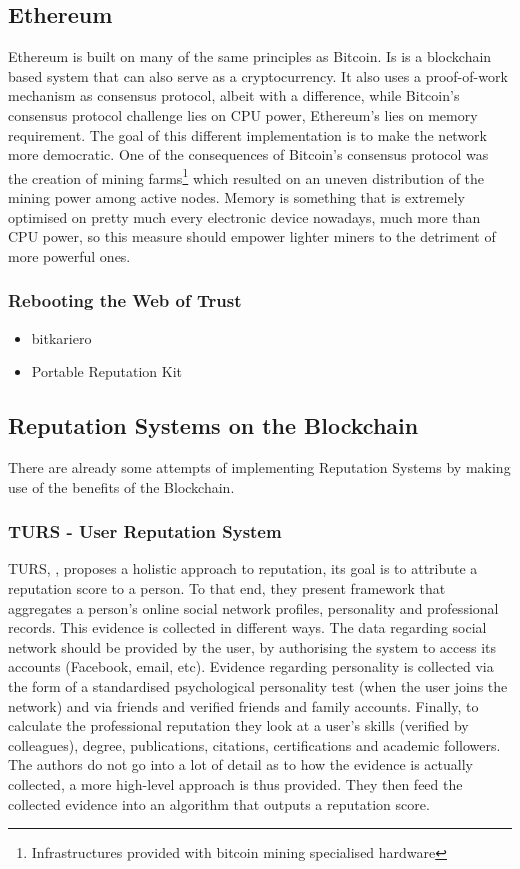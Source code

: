 \documentclass[llncsdoc]{llncs}
\begin{document}
\subsection{Ethereum}
Ethereum is built on many of the same principles as Bitcoin. Is is a blockchain based system that can also serve as a cryptocurrency. It also uses a proof-of-work mechanism as consensus protocol, albeit with a difference, while Bitcoin's consensus protocol challenge lies on CPU power, Ethereum's lies on memory requirement. The goal of this different implementation is to make the network more democratic. One of the consequences of Bitcoin's consensus protocol was the creation of mining farms\footnote{Infrastructures provided with bitcoin mining specialised hardware} which resulted on an uneven distribution of the mining power among active nodes. Memory is something that is extremely optimised on pretty much every electronic device nowadays, much more than CPU power, so this measure should empower lighter miners to the detriment of more powerful ones.  


\subsubsection{Rebooting the Web of Trust}
\begin{itemize}
    \item bitkariero
    \item Portable Reputation Kit
\end{itemize}

\subsection{Reputation Systems on the Blockchain}

There are already some attempts of implementing Reputation Systems by making use of the benefits of the Blockchain.
\subsubsection{TURS - User Reputation System}
TURS, \cite{Yasin:2016ja}, proposes a holistic approach to reputation, its goal is to attribute a reputation score to a person. To that end, they present framework that aggregates a person's online social network profiles, personality and professional records. This evidence is collected in different ways. The data regarding social network should be provided by the user, by authorising the system to access its accounts (Facebook, email, etc). Evidence regarding personality is collected via the form of a standardised psychological personality test (when the user joins the network) and via friends and verified friends and family accounts. Finally, to calculate the professional reputation they look at a user's skills (verified by colleagues), degree, publications, citations, certifications and academic followers. The authors do not go into a lot of detail as to how the evidence is actually collected, a more high-level approach is thus provided.
They then feed the collected evidence into an algorithm that outputs a reputation score. 
\end{document}
